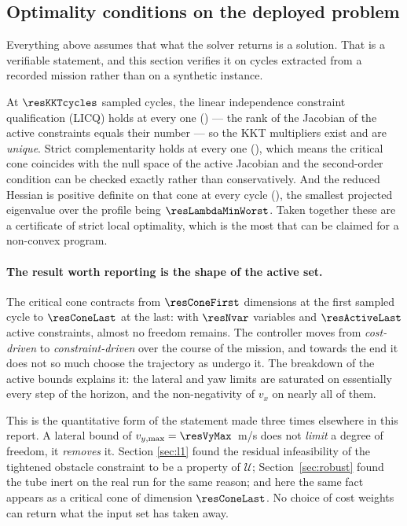 \documentclass[11pt,a4paper]{article}
\begin{document}
\subsection{Optimality conditions on the deployed problem}
\label{sec:kkt}

Everything above assumes that what the solver returns is a solution. That is a verifiable statement, and this
section verifies it on cycles extracted from a recorded mission rather than on a synthetic instance.


At $\resKKTcycles$ sampled cycles, the linear independence constraint qualification (LICQ) holds at every one (\resLICQalways) --- the rank of the Jacobian of
the active constraints equals their number --- so the KKT multipliers exist and are \emph{unique}. Strict
complementarity holds at every one (\resStrictAlways), which means the critical cone coincides with the null
space of the active Jacobian and the second-order condition can be checked exactly rather than
conservatively. And the reduced Hessian is positive definite on that cone at every cycle
(\resSOCalways), the smallest projected eigenvalue over the profile being $\resLambdaMinWorst$. Taken
together these are a certificate of strict local optimality, which is the most that can be claimed for a
non-convex program.

\paragraph{The result worth reporting is the shape of the active set.} The critical cone contracts from
$\resConeFirst$ dimensions at the first sampled cycle to $\resConeLast$ at the last: with $\resNvar$
variables and $\resActiveLast$ active constraints, almost no freedom remains. The controller moves from
\emph{cost-driven} to \emph{constraint-driven} over the course of the mission, and towards the end it does
not so much choose the trajectory as undergo it. The breakdown of the active bounds explains it: the lateral
and yaw limits are saturated on essentially every step of the horizon, and the non-negativity of $v_x$ on
nearly all of them.

This is the quantitative form of the statement made three times elsewhere in this report. A lateral bound of
$v_{y,\max}=\resVyMax$~m/s does not \emph{limit} a degree of freedom, it \emph{removes} it. Section
\ref{sec:l1} found the residual infeasibility of the tightened obstacle constraint to be a property of
$\mathcal{U}$; Section~\ref{sec:robust} found the tube inert on the real run for the same reason; and here
the same fact appears as a critical cone of dimension $\resConeLast$. No choice of cost weights can return
what the input set has taken away.
\end{document}

